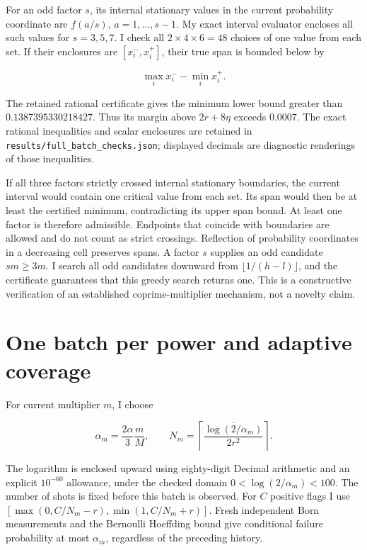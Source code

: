 For an odd factor \(s\), its internal stationary values in the current probability coordinate are \(f(a/s)\), \(a=1,\ldots,s-1\). My exact interval evaluator encloses all such values for \(s=3,5,7\). I check all \(2\times4\times6=48\) choices of one value from each set. If their enclosures are \([x_i^-,x_i^+]\), their true span is bounded below by

\[
 \max_i x_i^- - \min_i x_i^+.
\]

The retained rational certificate gives the minimum lower bound greater than \(0.1387395330218427\). Thus its margin above \(2r+8\eta\) exceeds \(0.0007\). The exact rational inequalities and scalar enclosures are retained in \texttt{results/full\_batch\_checks.json}; displayed decimals are diagnostic renderings of those inequalities.

If all three factors strictly crossed internal stationary boundaries, the current interval would contain one critical value from each set. Its span would then be at least the certified minimum, contradicting its upper span bound. At least one factor is therefore admissible. Endpoints that coincide with boundaries are allowed and do not count as strict crossings. Reflection of probability coordinates in a decreasing cell preserves spans. A factor \(s\) supplies an odd candidate \(sm\geq3m\). I search all odd candidates downward from \(\lfloor1/(h-l)\rfloor\), and the certificate guarantees that this greedy search returns one. This is a constructive verification of an established coprime-multiplier mechanism, not a novelty claim.

\section{One batch per power and adaptive coverage}
\label{sec:miqae-coverage}

For current multiplier \(m\), I choose

\[
 \alpha_m=\frac{2\alpha}{3}\frac mM,
 \qquad N_m=
 \left\lceil\frac{\overline{\log(2/\alpha_m)}}{2r^2}\right\rceil.
\]

The logarithm is enclosed upward using eighty-digit Decimal arithmetic and an explicit \(10^{-60}\) allowance, under the checked domain \(0<\log(2/\alpha_m)<100\). The number of shots is fixed before this batch is observed. For \(C\) positive flags I use \([\max(0,C/N_m-r),\min(1,C/N_m+r)]\). Fresh independent Born measurements and the Bernoulli Hoeffding bound give conditional failure probability at most \(\alpha_m\), regardless of the preceding history.

